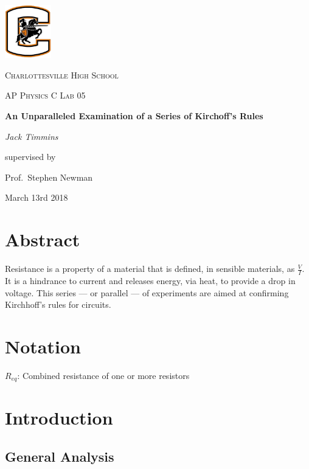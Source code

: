 \documentclass[aps,reprint,floatfix]{revtex4-1}
\newcommand{\forceindent}{\leavevmode{\parindent=1em\indent}}
\begin{document}
\begin{titlepage}
	\centering
	\includegraphics[width=0.15\textwidth]{CHSLogo.png}\par\vspace{1cm}
	{\scshape\LARGE Charlottesville High School \par}
	\vspace{1cm}
	{\scshape\Large AP Physics C Lab 05\par}
	\vspace{1.5cm}
	{\huge\bfseries An Unparalleled Examination of a Series of Kirchoff's Rules \par}
	\vspace{2cm}
	{\Large\itshape Jack Timmins \par}
	\vspace{9.75cm}
	supervised by\par
	Prof.~Stephen Newman\par
	March 13rd 2018
	\newpage
\end{titlepage}

\section{Abstract}
\forceindent Resistance is a property of a material that is defined, in sensible materials, as $\frac{V}{I}$. It is a hindrance to current and releases energy, via heat, to provide a drop in voltage. This series — or parallel — of experiments are aimed at confirming Kirchhoff's rules for circuits.

\section{Notation}

$R_{eq}$: Combined resistance of one or more resistors

\section{Introduction}
	
	\subsection{General Analysis}	
		
\end{document}
